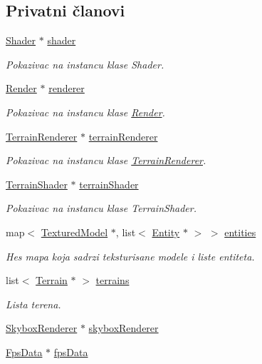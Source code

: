 \subsection*{Privatni članovi}
\begin{DoxyCompactItemize}
\item 
\hyperlink{classshader_1_1Shader}{Shader} $\ast$ \hyperlink{classcore_1_1MainRenderer_a9e5b8ba9a151d64b79612b8631fc1255}{shader}
\begin{DoxyCompactList}\small\item\em Pokazivac na instancu klase Shader. \end{DoxyCompactList}\item 
\hyperlink{classcore_1_1Render}{Render} $\ast$ \hyperlink{classcore_1_1MainRenderer_a3cdbf7f833cac2e18e8bb7d3cdd7728d}{renderer}
\begin{DoxyCompactList}\small\item\em Pokazivac na instancu klase \hyperlink{classcore_1_1Render}{Render}. \end{DoxyCompactList}\item 
\hyperlink{classcore_1_1TerrainRenderer}{Terrain\+Renderer} $\ast$ \hyperlink{classcore_1_1MainRenderer_aba23d91ed6ade9c35600156c0e1f0d83}{terrain\+Renderer}
\begin{DoxyCompactList}\small\item\em Pokazivac na instancu klase \hyperlink{classcore_1_1TerrainRenderer}{Terrain\+Renderer}. \end{DoxyCompactList}\item 
\hyperlink{classshader_1_1TerrainShader}{Terrain\+Shader} $\ast$ \hyperlink{classcore_1_1MainRenderer_a502a7c6f714266f27601913496c396f3}{terrain\+Shader}
\begin{DoxyCompactList}\small\item\em Pokazivac na instancu klase Terrain\+Shader. \end{DoxyCompactList}\item 
map$<$ \hyperlink{classmodel_1_1TexturedModel}{Textured\+Model} $\ast$, list$<$ \hyperlink{classentity_1_1Entity}{Entity} $\ast$ $>$ $>$ \hyperlink{classcore_1_1MainRenderer_a609ec87995b16fcca439ce5585993fc4}{entities}
\begin{DoxyCompactList}\small\item\em Hes mapa koja sadrzi teksturisane modele i liste entiteta. \end{DoxyCompactList}\item 
list$<$ \hyperlink{classterrain_1_1Terrain}{Terrain} $\ast$ $>$ \hyperlink{classcore_1_1MainRenderer_ada8a51626222137e00ae29445e28f892}{terrains}
\begin{DoxyCompactList}\small\item\em Lista terena. \end{DoxyCompactList}\item 
\hyperlink{classcore_1_1SkyboxRenderer}{Skybox\+Renderer} $\ast$ \hyperlink{classcore_1_1MainRenderer_a2e02e2528a233d92ed37587fa2ba38a4}{skybox\+Renderer}
\item 
\hyperlink{classutility_1_1FpsData}{Fps\+Data} $\ast$ \hyperlink{classcore_1_1MainRenderer_a0ea0659ecfb85286fb5f2bb1d8dc1be1}{fps\+Data}
\end{DoxyCompactItemize}


